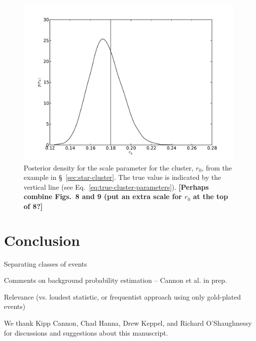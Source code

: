 \documentclass[aps,prd]{revtex4-1}
\newcommand{\ilya}[1]{{\color{red} \bf #1}}
\begin{document}
\begin{figure}
  \includegraphics[width=\columnwidth]{scale}
  \caption{\label{fig:cluster-scale} Posterior density for the scale
    parameter for the cluster, $r_0$, from the example in
    \S~\ref{sec:star-cluster}.  The true value is indicated by the
    vertical line (see Eq.~\ref{eq:true-cluster-parameters}).
    \ilya{[Perhaps combine Figs.~8 and 9 (put an extra scale for $r_0$
        at the top of 8?]} }
\end{figure}

\section{Conclusion}

Separating classes of events

Comments on background probability estimation -- Cannon et al. in
prep.

Relevance (vs. loudest statistic, or frequentist approach using only
gold-plated events)

\begin{acknowledgments}
  We thank Kipp Cannon, Chad Hanna, Drew Keppel, and Richard
  O'Shaughnessy for discussions and suggestions about this manuscript.
\end{acknowledgments}

 
\end{document}
